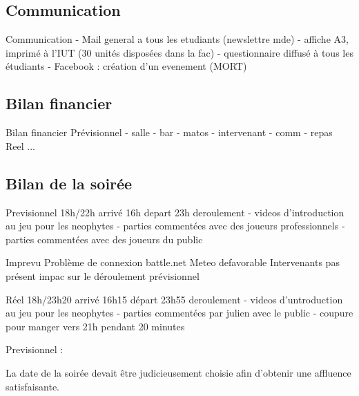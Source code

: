 \subsection{Communication}%
\label{sub:communication}

Communication
        - Mail general a tous les etudiants (newslettre mde)
        - affiche A3, imprimé à l'IUT (30 unités disposées dans la fac)
        - questionnaire diffusé à tous les étudiants
        - Facebook : création d'un evenement (MORT)

\subsection{Bilan financier}%
\label{sub:bilan_financier}

Bilan financier
        Prévisionnel
            - salle
            - bar
            - matos
            - intervenant
            - comm
            - repas
        Reel
           ...

\subsection{Bilan de la soirée}%
\label{sub:Bilan_de_la_soiree}

Previsionnel
    18h/22h
    arrivé 16h
    depart 23h
    deroulement
        - videos d'introduction au jeu pour les neophytes
        - parties commentées avec des joueurs professionnels
        - parties commentées avec des joueurs du public

Imprevu
   Problème de connexion battle.net
   Meteo defavorable
   Intervenants pas présent
   impac sur le déroulement prévisionnel

Réel
    18h/23h20
    arrivé 16h15
    départ 23h55
    deroulement
        - videos d'untroduction au jeu pour les neophytes
        - parties commentées par julien avec le public
        - coupure pour manger vers 21h pendant 20 minutes

Previsionnel :

La date de la soirée devait être judicieusement choisie afin d'obtenir une affluence satisfaisante.

